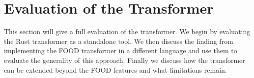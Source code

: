 \documentclass[ oneside,%
                    author={James Elgar},
                    degree={MEng},
                     title={Bidirectional transformer between functional and \\ object-oriented programming in Rust},
                  subtitle={}]{dissertation}
\begin{document}




% 


\chapter{Evaluation of the Transformer}
\label{chap:evaluation}

This section will give a full evaluation of the transformer. We begin by evaluating the Rust transformer as a standalone tool. We then discuss the finding from implementing the FOOD transformer in a different language and use them to evaluate the generality of this approach. Finally we discuss how the transformer can be extended beyond the FOOD features and what limitations remain.
\end{document}
